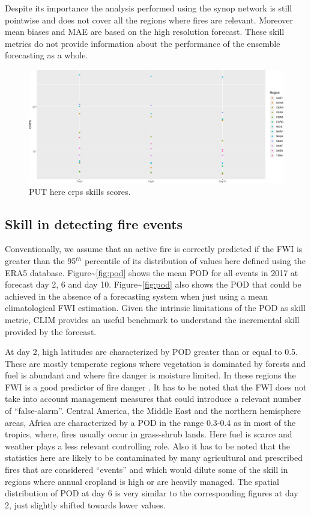 \documentclass[, manuscript]{copernicus}
\begin{document}
Despite its importance the analysis performed using the synop network is
still pointwise and does not cover all the regions where fires are
relevant. Moreover mean biases and MAE are based on the high resolution
forecast. These skill metrics do not provide information about the
performance of the ensemble forecasting as a whole.

\begin{figure}
\includegraphics[width=1\linewidth]{article_files/figure-latex/Figure4-1} \caption{\label{fig:Figure4}PUT here crps skills scores.}\label{fig:Figure4}
\end{figure}

\subsection{Skill in detecting fire events}

Conventionally, we assume that an active fire is correctly predicted if
the FWI is greater than the 95\(^{th}\) percentile of its distribution
of values here defined using the ERA5 database.
Figure\textasciitilde{}\ref{fig:pod} shows the mean POD for all events
in 2017 at forecast day 2, 6 and day 10.
Figure\textasciitilde{}\ref{fig:pod} also shows the POD that could be
achieved in the absence of a forecasting system when just using a mean
climatological FWI estimation. Given the intrinsic limitations of the
POD as skill metric, CLIM provides an useful benchmark to understand the
incremental skill provided by the forecast.

At day 2, high latitudes are characterized by POD greater than or equal
to 0.5. These are mostly temperate regions where vegetation is dominated
by forests and fuel is abundant and where fire danger is moisture
limited. In these regions the FWI is a good predictor of fire danger
\citep{digiuseppe:16}. It has to be noted that the FWI does not take
into account management measures that could introduce a relevant number
of ``false-alarm''. Central America, the Middle East and the northern
hemisphere areas, Africa are characterized by a POD in the range 0.3-0.4
as in most of the tropics, where, fires usually occur in grass-shrub
lands. Here fuel is scarce and weather plays a less relevant controlling
role. Also it has to be noted that the statistics here are likely to be
contaminated by many agricultural and prescribed fires that are
considered ``events'' and which would dilute some of the skill in
regions where annual cropland is high or are heavily managed. The
spatial distribution of POD at day 6 is very similar to the
corresponding figures at day 2, just slightly shifted towards lower
values.
\end{document}
